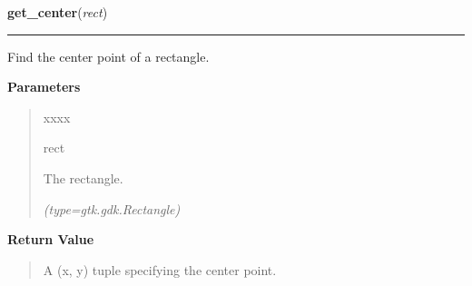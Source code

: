     \vspace{0.5ex}

\hspace{.8\funcindent}\begin{boxedminipage}{\funcwidth}

    \raggedright \textbf{get\_center}(\textit{rect})

    \vspace{-1.5ex}

    \rule{\textwidth}{0.5\fboxrule}
\setlength{\parskip}{2ex}
    Find the center point of a rectangle.

\setlength{\parskip}{1ex}
      \textbf{Parameters}
      \vspace{-1ex}

      \begin{quote}
        \begin{Ventry}{xxxx}

          \item[rect]

          The rectangle.

            {\it (type=gtk.gdk.Rectangle)}

        \end{Ventry}

      \end{quote}

      \textbf{Return Value}
    \vspace{-1ex}

      \begin{quote}
      A (x, y) tuple specifying the center point.

      \end{quote}

    \end{boxedminipage}

    \label{pygtk_chart:basics:color_gdk_to_cairo}

    \vspace{0.5ex}

